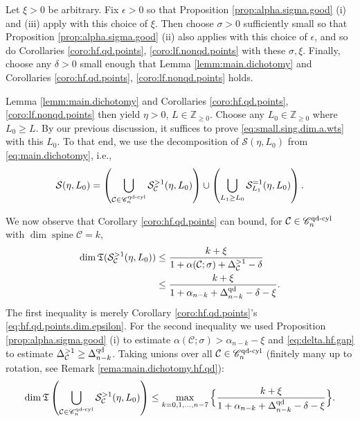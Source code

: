 \documentclass[11pt, letterpaper, reqno]{amsart}
\numberwithin{equation}{section}
\theoremstyle{remark}
\newcommand{\ZZ}{\mathbb{Z}}
\newcommand{\cC}{\mathcal{C}}
\newcommand{\cS}{\mathcal{S}}
\newcommand{\frT}{\mathfrak{T}}
\newcommand{\spine}{\operatorname{spine}}
\begin{document}
Let $\xi > 0$ be arbitrary. Fix $\epsilon > 0$ so that Proposition \ref{prop:alpha.sigma.good} (i) and (iii) apply with this choice of $\xi$. Then choose $\sigma > 0$ sufficiently small so that Proposition \ref{prop:alpha.sigma.good} (ii) also applies with this choice of $\epsilon$, and so do Corollaries \ref{coro:hf.qd.points}, \ref{coro:lf.nonqd.points} with these $\sigma, \xi$. Finally, choose any $\delta > 0$ small enough that Lemma \ref{lemm:main.dichotomy}
and Corollaries \ref{coro:hf.qd.points}, \ref{coro:lf.nonqd.points} holds. 

Lemma \ref{lemm:main.dichotomy} and Corollaries \ref{coro:hf.qd.points}, \ref{coro:lf.nonqd.points} then yield $\eta > 0$, $L \in \ZZ_{\geq 0}$. Choose any $L_0 \in \ZZ_{\geq 0}$ where $L_0 \geq L$. By our previous discussion, it suffices to prove \eqref{eq:small.sing.dim.a.wts} with this $L_0$. To that end, we use the decomposition of $\cS(\eta, L_0)$ from \eqref{eq:main.dichotomy}, i.e.,
\begin{equation} \label{eq:small.sing.dim.decomposition}
	\cS(\eta, L_0) = \left( \bigcup_{\cC \in \mathscr{C}_n^{\textnormal{qd-cyl}}} \cS^{>1}_\cC(\eta, L_0) \right) \cup \left( \bigcup_{L_1 \geq L_0} \cS^{=1}_{L_1}(\eta, L_0) \right).
\end{equation}

We now observe that Corollary \ref{coro:hf.qd.points} can bound, for $\cC \in \mathscr{C}_n^{\textnormal{qd-cyl}}$ with $\dim \spine \cC = k$,
\begin{align} \label{eq:small.sing.dim.hf.qd.fixed}
	\dim \frT(\cS^{>1}_\cC(\eta, L_0)) 
		& \leq \frac{k + \xi}{1 + \alpha(\cC; \sigma) + \Delta^{>1}_{\cC} - \delta} \nonumber \\
		& \leq \frac{k + \xi}{1 + \alpha_{n-k} + \Delta^{\textnormal{qd}}_{n-k} - \delta - \xi}.
\end{align}
The first inequality is merely Corollary \ref{coro:hf.qd.points}'s \eqref{eq:hf.qd.points.dim.epsilon}. For the second inequality we used Proposition \ref{prop:alpha.sigma.good} (i) to estimate $\alpha(\cC; \sigma) > \alpha_{n-k} - \xi$ and \eqref{eq:delta.hf.gap} to estimate $\Delta^{>1}_{\cC} \geq \Delta^{\textnormal{qd}}_{n-k}$. Taking unions over all $\cC \in \mathscr{C}_n^{\textnormal{qd-cyl}}$ (finitely many up to rotation, see Remark \ref{rema:main.dichotomy.hf.qd}):
\begin{equation} \label{eq:small.sing.dim.hf.qd}
	\dim \frT \left( \bigcup_{\cC \in \mathscr{C}_n^{\textnormal{qd-cyl}}} \cS^{>1}_\cC(\eta, L_0) \right) \leq \max_{k=0,1,\ldots,n-7} \Big\{ \frac{k + \xi}{1 + \alpha_{n-k} + \Delta^{\textnormal{qd}}_{n-k} - \delta - \xi} \Big\}.
\end{equation}
\end{document}
